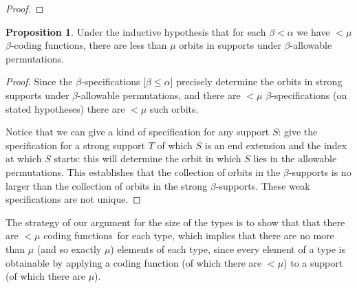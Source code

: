 \documentclass[112pt]{article}
\theoremstyle{definition}
\newtheorem{proposition}[theorem]{Proposition}
\theoremstyle{remark}
\newcommand{\rk}[1]{{\color{blue}\sl #1}}
\begin{document}
\begin{proof}
\begin{comment}
If we have $S_\epsilon=(M,A)$ for $M$ a near-litter
$S_\delta = (M',A)$ with $M \sim M'$, then observe that for each $z$ in $M \Delta M'$,
$(\{z\},A) \in {{\tt rng}}(S)$;  if $M \nsim M'$, observe that for each $z$ in $M \cap M'$,
$(\{z\},A) \in {{\tt rng}}(S)$ The computations already done to force $S_\epsilon$ to map to $T_\epsilon$, along with the easy calculations for atoms, show that there is no additional work needed in these cases, and so we do not do any, and no conflict arises. %

In the indicated way, we construct an approximation such that the allowable permutation it exactly approximates must have action sending $S$ to $T$, completing the proof of the Lemma.
\end{comment}
\end{proof}

\begin{proposition}\label{prop:count_support_orbits}
{Under the inductive hypothesis that for each $\beta<\alpha$ we have $<\mu$ $\beta$-coding functions, there are less than $\mu$ orbits in supports under $\beta$-allowable permutations.}
\end{proposition}
\begin{proof}
Since the $\beta$-specifications [$\beta \leq \alpha$] precisely determine the orbits in {strong} supports under $\beta$-allowable permutations, and there are $<\mu$ $\beta$-specifications
(on stated hypotheses) there are $<\mu$ such orbits.

Notice that we can give a kind of specification for any support $S$:  give the specification for a strong support $T$ of which $S$ is an end extension and the index at which $S$ starts:  this will determine the orbit in which $S$ lies in the allowable permutations.
This establishes that the collection of orbits in the $\beta$-supports is no larger than the collection of orbits in the strong $\beta$-supports.  These weak specifications are not unique. %
\end{proof}

The strategy of our argument for the size of the types is to show that that there are $<\mu$ coding functions\ for each type, which implies that there are no more than $\mu$ (and so exactly $\mu$) elements of each type, since every element of a type is obtainable by applying a coding function (of which there are $<\mu$) to a support (of which there are $\mu$).
\end{document}
